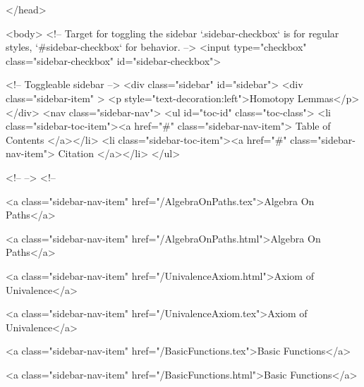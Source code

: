   
</head>




  <body>
    <!-- Target for toggling the sidebar `.sidebar-checkbox` is for regular
     styles, `#sidebar-checkbox` for behavior. -->
<input type="checkbox" class="sidebar-checkbox" id="sidebar-checkbox">

<!-- Toggleable sidebar -->
<div class="sidebar" id="sidebar">
  <div class="sidebar-item" >
    <p style="text-decoration:left">Homotopy Lemmas</p>
  </div>
  <nav class="sidebar-nav">
    <ul id="toc-id" class="toc-class">
  <li class="sidebar-toc-item"><a href="#" class="sidebar-nav-item"> Table of Contents </a></li>
  <li class="sidebar-toc-item"><a href="#" class="sidebar-nav-item"> Citation </a></li>
</ul>


    <!--  -->
    <!-- 
      
    
      
    
      
    
      
        
      
    
      
        
          <a class="sidebar-nav-item" href="/AlgebraOnPaths.tex">Algebra On Paths</a>
        
      
    
      
        
          <a class="sidebar-nav-item" href="/AlgebraOnPaths.html">Algebra On Paths</a>
        
      
    
      
        
          <a class="sidebar-nav-item" href="/UnivalenceAxiom.html">Axiom of Univalence</a>
        
      
    
      
        
          <a class="sidebar-nav-item" href="/UnivalenceAxiom.tex">Axiom of Univalence</a>
        
      
    
      
        
          <a class="sidebar-nav-item" href="/BasicFunctions.tex">Basic Functions</a>
        
      
    
      
        
          <a class="sidebar-nav-item" href="/BasicFunctions.html">Basic Functions</a>
        
      
    
      
        

